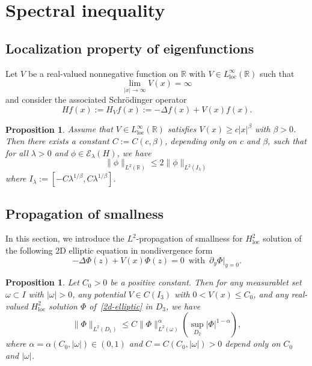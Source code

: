 \documentclass{amsart}
\newcommand\R{\ensuremath{\mathbb{R}}}
\newtheorem{proposition}[theorem]{Proposition}
\theoremstyle{definition}
\begin{document}
\section{Spectral inequality}

\subsection{Localization property of eigenfunctions}
Let $V$ be a real-valued nonnegative function on  $\R$ with $V\in L^{\infty}_{\mathrm{loc}}(\R)$ such that
\begin{equation}
	\lim_{|x| \to \infty} V(x)=\infty
\end{equation}
and consider the associated Schrödinger operator
\begin{equation}
	Hf(x):=H_{V}f(x):=-\Delta f(x)+V(x)f(x).
\end{equation}



\begin{proposition}\label{localization}
	Assume that $V\in L^{\infty}_{\mathrm{loc}}(\R)$ satisfies $V(x)\ge c|x|^{\beta}$ with $\beta>0$. Then there exists a constant $C:=C(c,\beta)$, depending only on $c$ and $\beta$, such that for all $\lambda>0$ and $\phi \in \mathcal{E}_\lambda(H)$, we have
	\begin{equation}
		\|\phi\|_{L^2(\R)}\le 2\|\phi\|_{L^2\left(I_{\lambda}\right)}
	\end{equation}
	where $I_{\lambda}:=[-C\lambda^{1 /\beta},C\lambda^{1 /\beta}]$.
\end{proposition}



\subsection{Propagation of smallness}
In this section, we introduce the $L^2$-propagation of smallness for $H^2_{\mathrm{loc}}$ solution of the following 2D elliptic equation in nondivergence form
\begin{equation}
	-\Delta \Phi(z)+V(x)\Phi(z)=0\, \text{ with }\,  \partial_y \Phi\lvert_{y=0}.\label{2d-elliptic}
\end{equation}
\begin{proposition}\label{propagation-prp}
	Let $C_0>0$ be a positive constant. Then for any measurablet set $\omega\subset I$ with $|\omega|>0$, any potential $V \in C(I_3)$ with $0<V(x)\le C_0$, and any real-valued $H^2_{\mathrm{loc}}$ solution $\Phi$ of~\eqref{2d-elliptic} in $D_3$, we have
	\begin{equation}
		\|\Phi\|_{L^2(D_1)}\le C\|\Phi\|^{\alpha}_{L^2(\omega)}\left( \sup_{D_2}|\Phi|^{1-\alpha} \right),\label{uniform-propagation} 
	\end{equation}
	where $\alpha=\alpha(C_0,|\omega|)\in (0,1)$ and $C=C(C_0,|\omega|)>0$ depend only on $C_0$ and $|\omega|$. 
\end{proposition}
\end{document}
